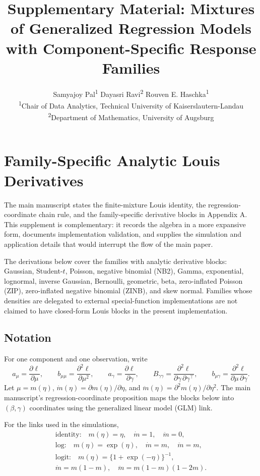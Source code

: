\documentclass{article}
\title{Supplementary Material: Mixtures of Generalized Regression Models with
Component-Specific Response Families}
\author{Samyajoy Pal\textsuperscript{1}\quad
Dayasri Ravi\textsuperscript{2}\quad
Rouven E. Haschka\textsuperscript{1}\\[0.75em]
\small \textsuperscript{1}Chair of Data Analytics, Technical University of Kaiserslautern-Landau\\
\small \textsuperscript{2}Department of Mathematics, University of Augsburg}
\date{}
\begin{document}
\maketitle

\section{Family-Specific Analytic Louis Derivatives}
\label{sec:supp_louis}

The main manuscript states the finite-mixture Louis identity, the
regression-coordinate chain rule, and the family-specific derivative blocks in
Appendix A.  This supplement is complementary: it records the algebra in a
more expansive form, documents implementation validation, and supplies the
simulation and application details that would interrupt the flow of the main
paper.

The derivations below cover the families with analytic derivative blocks:
Gaussian, Student-$t$, Poisson, negative binomial (NB2), Gamma, exponential,
lognormal, inverse Gaussian, Bernoulli, geometric, beta, zero-inflated Poisson
(ZIP), zero-inflated negative binomial (ZINB), and skew normal.  Families whose
densities are delegated to external special-function implementations are not
claimed to have closed-form Louis blocks in the present implementation.

\subsection{Notation}

For one component and one observation, write
\[
    a_\mu=\frac{\partial \ell}{\partial\mu},\qquad
    b_{\mu\mu}=\frac{\partial^2\ell}{\partial\mu^2},\qquad
    a_\gamma=\frac{\partial\ell}{\partial\gamma},\qquad
    B_{\gamma\gamma}=\frac{\partial^2\ell}{\partial\gamma\,\partial\gamma^\top},
    \qquad
    b_{\mu\gamma}=\frac{\partial^2\ell}{\partial\mu\,\partial\gamma}.
\]
Let $\mu=m(\eta)$, $\dot m(\eta)=\partial m(\eta)/\partial\eta$, and
$\ddot m(\eta)=\partial^2m(\eta)/\partial\eta^2$.  The main manuscript's
regression-coordinate proposition maps the blocks below into
$(\beta,\gamma)$ coordinates using the generalized linear model (GLM) link.

For the links used in the simulations,
\[
    \begin{gathered}
    \text{identity:}\quad m(\eta)=\eta,\quad
    \dot m=1,\quad \ddot m=0,\\
    \text{log:}\quad m(\eta)=\exp(\eta),\quad
    \dot m=m,\quad \ddot m=m,\\
    \text{logit:}\quad m(\eta)=\{1+\exp(-\eta)\}^{-1},\\
    \dot m=m(1-m),\quad
    \ddot m=m(1-m)(1-2m).
    \end{gathered}
\]
\end{document}
